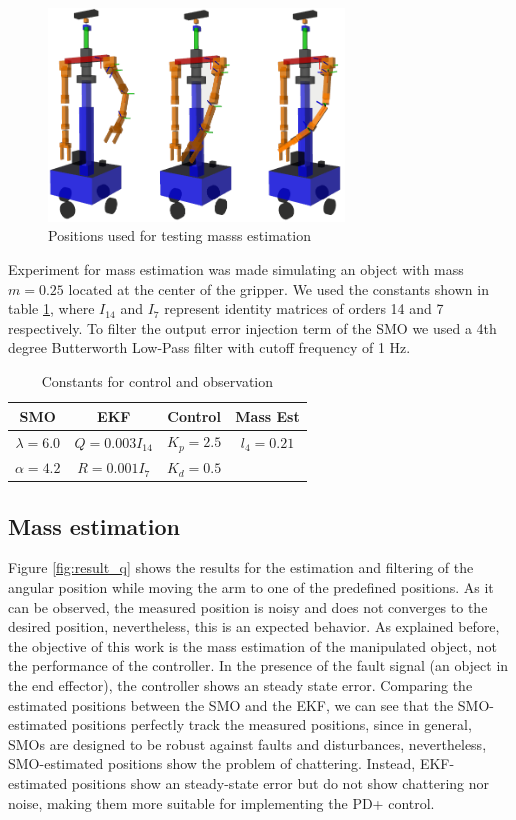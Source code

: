 \documentclass[a4paper, 10pt]{article}
\begin{document}
\begin{figure}[h!]
  \centering
  \includegraphics[width=0.7\textwidth]{Figures/test_poses.png}
  \caption{Positions used for testing masss estimation}
  \label{fig:test_poses}
\end{figure}

Experiment for mass estimation was made simulating an object with mass $m=0.25$ located at the center of the gripper. We used the constants shown in table \ref{tab:constants}, where $I_{14}$ and $I_7$ represent identity matrices of orders 14 and 7 respectively. To filter the output error injection term of the SMO we used a 4th degree Butterworth Low-Pass filter with cutoff frequency of 1 Hz. 
\begin{table}
  \centering
  \begin{tabular}{|c|c|c|c|}
    \hline
    SMO & EKF & Control & Mass Est\\
    \hline
    $\lambda=6.0$ & $Q = 0.003I_{14}$ & $K_p= 2.5$ & $l_4 = 0.21$\\
    $\alpha=4.2$ & $R = 0.001I_7$ & $K_d = 0.5$  & \\
    \hline
  \end{tabular}
  \caption{Constants for control and observation}
  \label{tab:constants}
\end{table}

\subsection{Mass estimation}
Figure \ref{fig:result_q} shows the results for the estimation and filtering of the angular position while moving the arm to one of the predefined positions. As it can be observed, the measured position is noisy and does not converges to the desired position, nevertheless, this is an expected behavior. As explained before, the objective of this work is the mass estimation of the manipulated object, not the performance of the controller. In the presence of the fault signal (an object in the end effector), the controller shows an steady state error. Comparing the estimated positions between the SMO and the EKF, we can see that the SMO-estimated positions perfectly track the measured positions, since in general, SMOs are designed to be robust against faults and disturbances, nevertheless, SMO-estimated positions show the problem of chattering. Instead, EKF-estimated positions show an steady-state error but do not show chattering nor noise, making them more suitable for implementing the PD+ control. 
\end{document}
